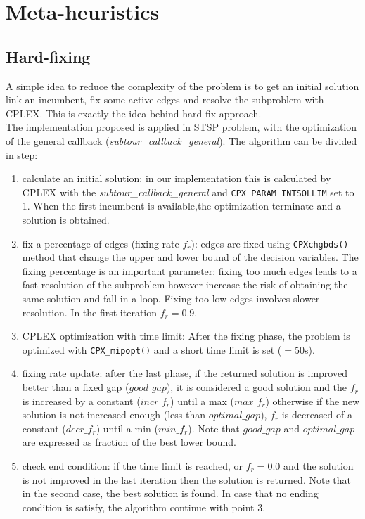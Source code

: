 \chapter{Meta-heuristics}

\section{Hard-fixing}
A simple idea to reduce the complexity of the problem is to get an initial solution link an incumbent, fix some active edges and resolve the subproblem with CPLEX. This is exactly the idea behind hard fix approach.\\
The implementation proposed is applied in STSP problem, with the optimization of the general callback (\textit{subtour\_callback\_general}).
The algorithm can be divided in step:
\begin{enumerate}
	\item calculate an initial solution: in our implementation this is calculated by CPLEX with the \textit{subtour\_callback\_general} and \texttt{CPX\_PARAM\_INTSOLLIM} set to 1. When the first incumbent is available,the optimization terminate and a solution is obtained.
	\item fix a percentage of edges (fixing rate $ f_r $): edges are fixed using \texttt{CPXchgbds()} method that change the upper and lower bound of the decision variables. The fixing percentage is an important parameter: fixing too much edges leads to a fast resolution of the subproblem however increase the risk of obtaining the same solution and fall in a loop. Fixing too low edges involves slower resolution. In the first iteration $ f_r = 0.9 $.
	\item CPLEX optimization with time limit: After the fixing phase, the problem is optimized with \texttt{CPX\_mipopt()} and a short time limit is set ($ = 50 $s).
	\item fixing rate update: after the last phase, if the returned solution is improved better than a fixed gap ($  good\_gap $), it is considered a good solution and the $ f_r $ is increased by a constant ($ incr\_f_r $) until a max ($ max\_f_r $) otherwise if the new solution is not increased enough (less than $ optimal\_gap $), $ f_r $ is decreased of a constant ($ decr\_f_r $) until a min ($ min\_f_r $). Note that $ good\_gap $ and $ optimal\_gap $ are expressed as fraction of the best lower bound.
	\item check end condition: if the time limit is reached, or $ f_r = 0.0 $ and the solution is not improved in the last iteration then the solution is returned. Note that in the second case, the best solution is found. In case that no ending condition is satisfy, the algorithm continue with point 3.
\end{enumerate}

